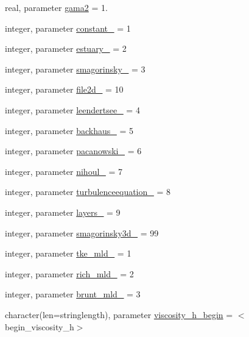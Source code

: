 \begin{DoxyCompactItemize}
\item 
real, parameter \mbox{\hyperlink{namespacemoduleturbulence_a54890d68b5eb7ba1cdad66eef22b56a6}{gama2}} = 1.
\item 
integer, parameter \mbox{\hyperlink{namespacemoduleturbulence_a1a6e5da84d7a92e32fbe23db2fd9c51d}{constant\+\_\+}} = 1
\item 
integer, parameter \mbox{\hyperlink{namespacemoduleturbulence_aa745ad2596a9341093ee58a720d8788b}{estuary\+\_\+}} = 2
\item 
integer, parameter \mbox{\hyperlink{namespacemoduleturbulence_a29d7fdceea6d5b2feff6d666d0532452}{smagorinsky\+\_\+}} = 3
\item 
integer, parameter \mbox{\hyperlink{namespacemoduleturbulence_a5b737b397ea4d53ee93ebaa2536042bb}{file2d\+\_\+}} = 10
\item 
integer, parameter \mbox{\hyperlink{namespacemoduleturbulence_ac18db79bbfe34ce5f8ecc3c5a81e44f2}{leendertsee\+\_\+}} = 4
\item 
integer, parameter \mbox{\hyperlink{namespacemoduleturbulence_a2e4474631725c7959668fd9dfe8f90d0}{backhaus\+\_\+}} = 5
\item 
integer, parameter \mbox{\hyperlink{namespacemoduleturbulence_a3919ba926fe406c56c698575129339b3}{pacanowski\+\_\+}} = 6
\item 
integer, parameter \mbox{\hyperlink{namespacemoduleturbulence_adadd9f612e4d053afcc2457f3e728ce1}{nihoul\+\_\+}} = 7
\item 
integer, parameter \mbox{\hyperlink{namespacemoduleturbulence_a4458bdc093d13a35fdeaae3b5d7a5de9}{turbulenceequation\+\_\+}} = 8
\item 
integer, parameter \mbox{\hyperlink{namespacemoduleturbulence_a7eb55bedf9f4cbaeb7e86ac31b2223a2}{layers\+\_\+}} = 9
\item 
integer, parameter \mbox{\hyperlink{namespacemoduleturbulence_a0c9974d78cad27746ab531d210087c49}{smagorinsky3d\+\_\+}} = 99
\item 
integer, parameter \mbox{\hyperlink{namespacemoduleturbulence_a6d843198335720f3520b5b04ae013ef0}{tke\+\_\+mld\+\_\+}} = 1
\item 
integer, parameter \mbox{\hyperlink{namespacemoduleturbulence_a7b1c6356cf135cccdc1fa4593c7a8e7e}{rich\+\_\+mld\+\_\+}} = 2
\item 
integer, parameter \mbox{\hyperlink{namespacemoduleturbulence_a8c9c8f005ce1bb83a3e5a8cebd69bae4}{brunt\+\_\+mld\+\_\+}} = 3
\item 
character(len=stringlength), parameter \mbox{\hyperlink{namespacemoduleturbulence_a860d5ece29b255ab5d250a33b6b5106c}{viscosity\+\_\+h\+\_\+begin}} = \textquotesingle{}$<$begin\+\_\+viscosity\+\_\+h$>$\textquotesingle{}

\end{DoxyCompactItemize}
